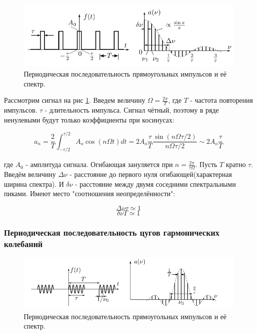 \documentclass{article}
\begin{document}
\begin{figure}[H]
\centering
\includegraphics[width=\textwidth]{square_imp_example.png}
\caption{Периодическая последовательность прямоугольных импульсов и её спектр.} 
\label{sq_imp}
\end{figure}
Рассмотрим сигнал на рис \ref{sq_imp}.
Введем величину \( \Omega = \frac{2\pi}{T} \), где $T$ - частота повторения импульсов. $\tau$ - 
длительность импульса. Сигнал чётный, поэтому в ряде ненулевыми будут только коэффициенты при косинусах:

\[ a_n = \frac{2}{T} \int_{-\tau/2}^{\tau/2} A_o \cos \left(n\Omega t\right) dt  = 
2A_o \frac{\tau}{T}\frac{\sin \left(n\Omega\tau/2\right)}{n\Omega\tau/2} \sim 2A_o\frac{\tau}{T}\]

где $A_0$ - амплитуда сигнала.
Огибающая зануляется при \( n = \frac{2\pi}{\tau\Omega} \). Пусть $T$ кратно $\tau$. Введём величину $\Delta\nu$ - 
расстояние до первого нуля огибающей(характерная ширина спектра). И $\delta\nu$ - расстояние между
двумя соседними спектральными пиками. Имеют место "соотношения неопределённости":

\[ \Delta\nu\tau \simeq 1 \]
\[ \delta\nu T \simeq 1 \]

\subsubsection{Периодическая последовательность цугов гармонических колебаний}

\begin{figure}[H]
    \centering
    \includegraphics[width=\textwidth]{cug_imp_example.png}
    \caption{Периодическая последовательность прямоугольных импульсов и её спектр.} 
    \label{cug_imp_example}
\end{figure}
\end{document}
